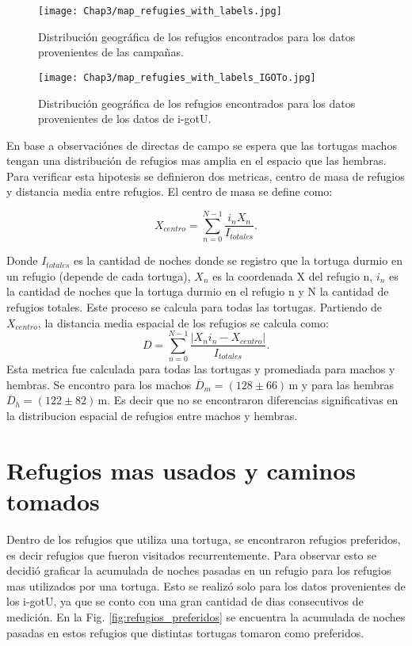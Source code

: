 \begin{figure}[ht]
    \begin{center}
        \texttt{[image: Chap3/map\_refugies\_with\_labels.jpg]}
        \caption{Distribución geográfica de los refugios encontrados para los datos provenientes de las campañas.} 
        \label{fig:refus_campanas_con_labels}
        
        \end{center}
\end{figure} 

\begin{figure}[ht]
    \begin{center}
        \texttt{[image: Chap3/map\_refugies\_with\_labels\_IGOTo.jpg]}
        \caption{Distribución geográfica de los refugios encontrados para los datos provenientes de los datos de i-gotU.} 
        \label{fig:refus_igotu_labels}
        
        \end{center}
\end{figure} 

En base a observaciónes de directas de campo \cite{Erika} se espera que las tortugas machos tengan una distribución de refugios mas amplia en el espacio que las hembras.  Para verificar esta hipotesis se definieron dos metricas, centro de masa de refugios y distancia media entre refugios. El centro de masa se define como:
\begin{center}
    

$$X_{centro}= \sum^{N -1}_{n=0} \frac{i_{n} X_n}{I_{totales}}.$$
\end{center}
Donde $I_{totales}$ es la cantidad de noches donde se registro que la tortuga durmio en un refugio (depende de cada tortuga), $X_n$ es la coordenada X del refugio n, $i_{n}$ es la cantidad de noches que la tortuga durmio en el refugio n y N la cantidad de refugios totales.  Este proceso se calcula para todas las tortugas. 
Partiendo de $X_{centro}$, la distancia media  espacial de los refugios se calcula como:
$$D = \sum^{N -1}_{n=0} \frac{|X_n i_n - X_{centro}|}{I_{totales}}.$$
\label{eq:distancia_media_refugios}
Esta metrica fue calculada para todas las tortugas y  promediada para  machos y hembras. Se encontro para los machos $\overline{D}_m =  (128\pm66)\,\text{m}$ y para las hembras     $\overline{D}_h = (122\pm82)\,\text{m}$. Es decir que no se encontraron diferencias significativas en la distribucion espacial de refugios  entre machos y hembras.
\section{Refugios mas usados y caminos tomados}
Dentro de los refugios que utiliza una tortuga, se encontraron refugios preferidos, es decir refugios que fueron visitados recurrentemente. Para observar esto se decidió graficar la acumulada de noches pasadas en un refugio para los refugios mas utilizados por una tortuga. Esto se realizó solo para los datos provenientes de los i-gotU, ya que se conto con una gran cantidad de dias consecutivos de medición. En la Fig. \ref{fig:refugios_preferidos} se encuentra la acumulada de noches pasadas en estos refugios que distintas tortugas tomaron como preferidos. 

